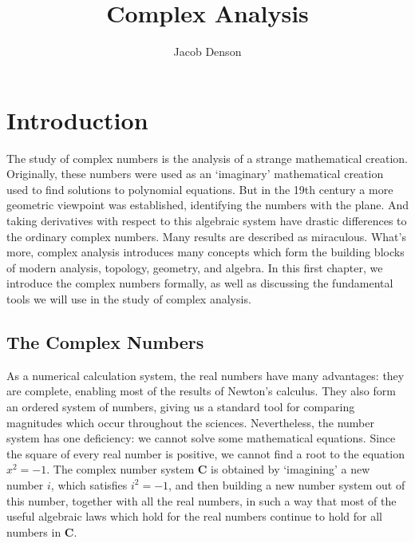 

\title{Complex Analysis}
\author{Jacob Denson}



\maketitle
\tableofcontents
{}

\chapter{Introduction}

The study of complex numbers is the analysis of a strange mathematical creation. Originally, these numbers were used as an `imaginary' mathematical creation used to find solutions to polynomial equations. But in the 19th century a more geometric viewpoint was established, identifying the numbers with the plane. And taking derivatives with respect to this algebraic system have drastic differences to the ordinary complex numbers. Many results are described as miraculous. What's more, complex analysis introduces many concepts which form the building blocks of modern analysis, topology, geometry, and algebra. In this first chapter, we introduce the complex numbers formally, as well as discussing the fundamental tools we will use in the study of complex analysis.

\section{The Complex Numbers}

As a numerical calculation system, the real numbers have many advantages: they are complete, enabling most of the results of Newton's calculus. They also form an ordered system of numbers, giving us a standard tool for comparing magnitudes which occur throughout the sciences. Nevertheless, the number system has one deficiency: we cannot solve some mathematical equations. Since the square of every real number is positive, we cannot find a root to the equation $x^2 = -1$. The complex number system $\mathbf{C}$ is obtained by `imagining' a new number $i$, which satisfies $i^2 = -1$, and then building a new number system out of this number, together with all the real numbers, in such a way that most of the useful algebraic laws which hold for the real numbers continue to hold for all numbers in $\mathbf{C}$.

